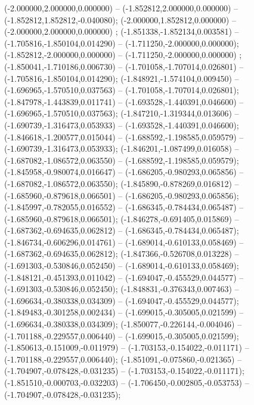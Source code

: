  (-2.000000,2.000000,0.000000) -- (-1.852812,2.000000,0.000000) -- (-1.852812,1.852812,-0.040080);
 (-2.000000,1.852812,0.000000) -- (-2.000000,2.000000,0.000000) ;
 (-1.851338,-1.852134,0.003581) -- (-1.705816,-1.850104,0.014290) -- (-1.711250,-2.000000,0.000000);
 (-1.852812,-2.000000,0.000000) -- (-1.711250,-2.000000,0.000000) ;
 (-1.850041,-1.710186,0.006730) -- (-1.701058,-1.707014,0.026801) -- (-1.705816,-1.850104,0.014290);
 (-1.848921,-1.574104,0.009450) -- (-1.696965,-1.570510,0.037563) -- (-1.701058,-1.707014,0.026801);
 (-1.847978,-1.443839,0.011741) -- (-1.693528,-1.440391,0.046600) -- (-1.696965,-1.570510,0.037563);
 (-1.847210,-1.319344,0.013606) -- (-1.690739,-1.316473,0.053933) -- (-1.693528,-1.440391,0.046600);
 (-1.846618,-1.200577,0.015044) -- (-1.688592,-1.198585,0.059579) -- (-1.690739,-1.316473,0.053933);
 (-1.846201,-1.087499,0.016058) -- (-1.687082,-1.086572,0.063550) -- (-1.688592,-1.198585,0.059579);
 (-1.845958,-0.980074,0.016647) -- (-1.686205,-0.980293,0.065856) -- (-1.687082,-1.086572,0.063550);
 (-1.845890,-0.878269,0.016812) -- (-1.685960,-0.879618,0.066501) -- (-1.686205,-0.980293,0.065856);
 (-1.845997,-0.782055,0.016552) -- (-1.686345,-0.784434,0.065487) -- (-1.685960,-0.879618,0.066501);
 (-1.846278,-0.691405,0.015869) -- (-1.687362,-0.694635,0.062812) -- (-1.686345,-0.784434,0.065487);
 (-1.846734,-0.606296,0.014761) -- (-1.689014,-0.610133,0.058469) -- (-1.687362,-0.694635,0.062812);
 (-1.847366,-0.526708,0.013228) -- (-1.691303,-0.530846,0.052450) -- (-1.689014,-0.610133,0.058469);
 (-1.848121,-0.451393,0.011042) -- (-1.694047,-0.455529,0.044577) -- (-1.691303,-0.530846,0.052450);
 (-1.848831,-0.376343,0.007463) -- (-1.696634,-0.380338,0.034309) -- (-1.694047,-0.455529,0.044577);
 (-1.849483,-0.301258,0.002434) -- (-1.699015,-0.305005,0.021599) -- (-1.696634,-0.380338,0.034309);
 (-1.850077,-0.226144,-0.004046) -- (-1.701188,-0.229557,0.006440) -- (-1.699015,-0.305005,0.021599);
 (-1.850613,-0.151009,-0.011979) -- (-1.703153,-0.154022,-0.011171) -- (-1.701188,-0.229557,0.006440);
 (-1.851091,-0.075860,-0.021365) -- (-1.704907,-0.078428,-0.031235) -- (-1.703153,-0.154022,-0.011171);
 (-1.851510,-0.000703,-0.032203) -- (-1.706450,-0.002805,-0.053753) -- (-1.704907,-0.078428,-0.031235);
